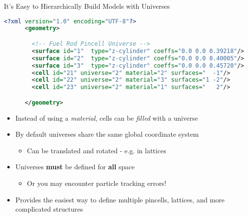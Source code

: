 \begin{frame}[fragile]{It's Easy to Hierarchically Build Models with Universes}

  \begin{scriptsize}
    \begin{lstlisting}[language=XML,gobble=4]
      <?xml version="1.0" encoding="UTF-8"?>
      <geometry>

        <!-- Fuel Rod Pincell Universe -->
        <surface id="1"  type="z-cylinder" coeffs="0.0 0.0 0.39218"/>     <!-- fuel OR   -->
        <surface id="2"  type="z-cylinder" coeffs="0.0 0.0 0.40005"/>     <!-- gap OR    -->
        <surface id="3"  type="z-cylinder" coeffs="0.0 0.0 0.45720"/>     <!-- clad OR   -->
        <cell id="21" universe="2" material="2" surfaces="  -1"/>         <!-- fuel  -->
        <cell id="22" universe="2" material="3" surfaces="1 -2"/>         <!-- clad  -->
        <cell id="23" universe="2" material="1" surfaces="   2"/>         <!-- water -->

      </geometry>
    \end{lstlisting}
  \end{scriptsize}


  \begin{itemize}
    \item Instead of using a \textit{material}, cells can be \textit{filled} with a universe
    \item By default universes share the same global coordinate system
    \begin{itemize}
      \item Can be translated and rotated - e.g. in lattices
    \end{itemize}
    \item Universes \textbf{must} be defined for \textbf{all} space
    \begin{itemize}
      \item Or you may encounter particle tracking errors!
    \end{itemize}
    \item Provides the easiest way to define multiple pincells, lattices, and 
    more complicated structures
  \end{itemize}


\end{frame}


